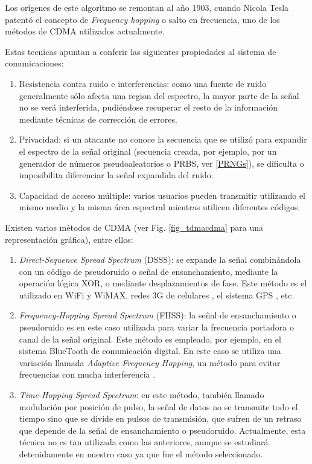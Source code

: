 Los orígenes de este algoritmo se remontan al año 1903, cuando Nicola Tesla patentó el concepto de \textit{Frequency hopping} o salto en frecuencia, uno de los métodos de CDMA utilizados actualmente.

Estas tecnicas apuntan a conferir las siguientes propiedades al sistema de comunicaciones:
\begin{enumerate} 
\item Resistencia contra ruido e interferencias: como una fuente de ruido generalmente sólo afecta una region del espectro, la mayor parte de la señal no se verá interferida, pudiéndose recuperar el resto de la información mediante técnicas de corrección de errores.
\item Privacidad: si un atacante no conoce la secuencia que se utilizó para expandir el espectro de la señal original (secuencia creada, por ejemplo, por un generador de números pseudoaleatorios o PRBS, ver \ref{PRNGs}), se dificulta o imposibilita diferenciar la señal expandida del ruido.
\item Capacidad de acceso múltiple: varios usuarios pueden transmitir utilizando el mismo medio y la misma área espectral mientras utilicen diferentes códigos.
\end{enumerate} 

Existen varios métodos de CDMA (ver Fig. \ref{fig_tdmacdma} para una representación gráfica), entre ellos:
\begin{enumerate} 
\item \textit{Direct-Sequence Spread Spectrum} (DSSS): se expande la señal combinándola con un código de pseudoruido o señal de ensanchamiento, mediante la operación lógica XOR, o mediante desplazamientos de fase. Este método es el utilizado en WiFi y WiMAX, redes 3G de celulares \cite{dixon1994spread}, el sistema GPS \cite{kaplan2005understanding}, etc.
\item \textit{Frequency-Hopping Spread Spectrum} (FHSS): la señal de ensanchamiento o pseudoruido es en este caso utilizada para variar la frecuencia portadora o canal de la señal original. Este método es empleado, por ejemplo, en el sistema BlueTooth de comunicación digital. En este caso se utiliza una variación llamada \textit{Adaptive Frequency Hopping}, un método para evitar frecuencias con mucha interferencia \cite{golmie2003bluetooth}.
\item \textit{Time-Hopping Spread Spectrum}: en este método, también llamado modulación por posición de pulso, la señal de datos no se transmite todo el tiempo sino que se divide en pulsos de transmisión, que sufren de un retraso que depende de la señal de ensanchamiento o pseudoruido. Actualmente, esta técnica no es tan utilizada como las anteriores, aunque se estudiará detenidamente en nuestro caso ya que fue el método seleccionado.
\end{enumerate} 

